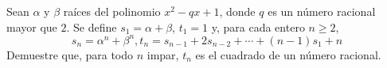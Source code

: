 Sean $\alpha$ y $\beta$ raíces del polinomio $x^2-qx+1$, donde $q$ es un número racional mayor que $2$. Se define $s_1 = \alpha + \beta$, $t_1 = 1$ y, para cada entero $n \geq 2$,
\[ s_n = \alpha^n + \beta^n, t_n = s_{n-1} + 2s_{n-2} + \cdots + (n-1)s_1 + n \]
Demuestre que, para todo $n$ impar, $t_n$ es el cuadrado de un número racional.
